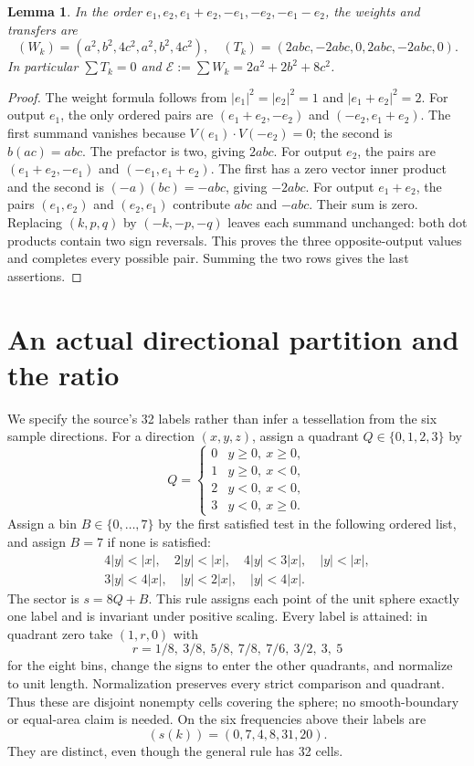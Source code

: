\documentclass[11pt]{article}
\newtheorem{lemma}[theorem]{Lemma}
\begin{document}
\begin{lemma}\label{lem:table}
In the order $e_1,e_2,e_1+e_2,-e_1,-e_2,-e_1-e_2$, the weights
and transfers are
\[
 (W_k)=(a^2,b^2,4c^2,a^2,b^2,4c^2),
\quad
 (T_k)=(2abc,-2abc,0,2abc,-2abc,0).
\]
In particular $\sum T_k=0$ and
$\mathcal E:=\sum W_k=2a^2+2b^2+8c^2$.
\end{lemma}
\begin{proof}
The weight formula follows from $|e_1|^2=|e_2|^2=1$ and
$|e_1+e_2|^2=2$. For output $e_1$, the only ordered pairs are
$(e_1+e_2,-e_2)$ and $(-e_2,e_1+e_2)$.
The first summand vanishes because
$V(e_1)\cdot V(-e_2)=0$; the second is $b(ac)=abc$.
The prefactor is two, giving $2abc$. For output $e_2$, the pairs
are $(e_1+e_2,-e_1)$ and $(-e_1,e_1+e_2)$.
The first has a zero vector inner product and the second is
$(-a)(bc)=-abc$, giving $-2abc$. For output $e_1+e_2$, the
pairs $(e_1,e_2)$ and $(e_2,e_1)$ contribute $abc$ and $-abc$.
Their sum is zero. Replacing $(k,p,q)$ by $(-k,-p,-q)$ leaves
each summand unchanged: both dot products contain two sign reversals.
This proves the three opposite-output values and completes every
possible pair. Summing the two rows gives the last assertions.
\end{proof}

\section{An actual directional partition and the ratio}
We specify the source's 32 labels rather than infer a tessellation from
the six sample directions. For a direction $(x,y,z)$, assign a quadrant
$Q\in\{0,1,2,3\}$ by
\[
 Q=\begin{cases}0&y\geq0,\ x\geq0,\\1&y\geq0,\ x<0,\\
 2&y<0,\ x<0,\\3&y<0,\ x\geq0.\end{cases}
\]
Assign a bin $B\in\{0,\ldots,7\}$ by the first satisfied test in
the following ordered list, and assign $B=7$ if none is satisfied:
\[\begin{gathered}
 4|y|<|x|,\quad2|y|<|x|,\quad4|y|<3|x|,\quad|y|<|x|,\\
 3|y|<4|x|,\quad|y|<2|x|,\quad|y|<4|x|.
\end{gathered}\]
The sector is $s=8Q+B$. This rule assigns each point of the unit
sphere exactly one label and is invariant under positive scaling.
Every label is attained: in quadrant zero take $(1,r,0)$ with
\[
 r=1/8,\ 3/8,\ 5/8,\ 7/8,\ 7/6,\ 3/2,\ 3,\ 5
\]
for the eight bins, change the signs to enter the other quadrants,
and normalize to unit length. Normalization preserves every strict
comparison and quadrant. Thus these are disjoint nonempty cells
covering the sphere; no smooth-boundary or equal-area claim is needed.
On the six frequencies above their labels are
\[
 (s(k))=(0,7,4,8,31,20).
\]
They are distinct, even though the general rule has 32 cells.
\end{document}
